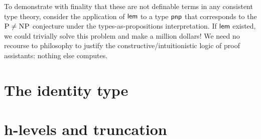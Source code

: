 \documentclass[./thesis.tex]{subfiles}
\begin{document}
To demonstrate with finality that these are not definable terms in any
consistent type theory, consider the application of $\mathsf{lem}$ to a type
$\mathsf{pnp}$ that corresponds to the $\textsc{P}\neq\textsc{NP}$ conjecture
under the types-as-propositions interpretation. If $\mathsf{lem}$ existed, we
could trivially solve this problem and make a million dollars! We need no
recourse to philosophy to justify the constructive/intuitionistic logic of proof
assistants: nothing else computes.

\section{The identity type}
\label{sec:the-identity-type}







\section{h-levels and truncation}
\label{sec:h-levels and truncation}
\end{document}
